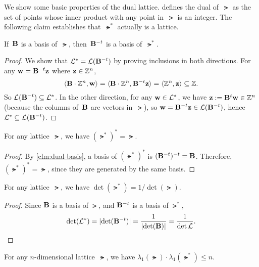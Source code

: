 \documentclass[11pt]{article}
\begin{document}
We show some basic properties of the dual lattice.
 defines the dual of~$\lat$ as the set of
points whose inner product with any point in~$\lat$ is an integer. The
following claim establishes that~$\lat^*$ actually is a lattice.

\begin{claim}
  \label{clm:dual-basis}
  If~$\mathbf{B}$ is a basis of~$\lat$, then~$\mathbf{B}^{-t}$ is a basis
  of~$\lat^*$.
\end{claim}

\begin{proof}
  We show that $\mathcal{L}^{*} = \mathcal{L}(\mathbf{B}^{-t})$ by proving inclusions in
  both directions. For any $\mathbf{w} = \mathbf{B}^{-t} \mathbf{z}$ where
  $\mathbf{z} \in \mathbb{Z}^n$,
  \[ \langle\mathbf{B} \cdot \mathbb{Z}^n, \mathbf{w}\rangle = \langle\mathbf{B} \cdot
      \mathbb{Z}^n,\mathbf{B}^{-t} \mathbf{z}\rangle = \langle\mathbb{Z}^n,\mathbf{z}\rangle \subseteq \mathbb{Z}. \] So
  $\mathcal{L}(\mathbf{B}^{-t}) \subseteq \mathcal{L}^*$. In the other direction, for any
  $\mathbf{w} \in \mathcal{L}^*$, we have $\mathbf{z} := \mathbf{B}^{t}\mathbf{w} \in \mathbb{Z}^{n}$
  (because the columns of~$\mathbf{B}$ are vectors in~$\lat$), so
  $\mathbf{w} = \mathbf{B}^{-t} \mathbf{z} \in \mathcal{L}(\mathbf{B}^{-t})$, hence
  $\mathcal{L}^* \subseteq \mathcal{L}(\mathbf{B}^{-t})$.
\end{proof}

\begin{claim}
  For any lattice~$\lat$, we have $(\lat^*)^* = \lat$.
\end{claim}

\begin{proof}
  By \cref{clm:dual-basis}, a basis of $(\lat^*)^*$ is
  $(\mathbf{B}^{-t})^{-t} = \mathbf{B}$. Therefore, $(\lat^*)^{*} = \lat$, since
  they are generated by the same basis.
\end{proof}

\begin{claim}
  \label{clm:dual-determinant}
  For any lattice~$\lat$, we have $\det(\lat^*) = 1/\det(\lat)$.
\end{claim}

\begin{proof}
  Since $\mathbf{B}$ is a basis of $\lat$, and $\mathbf{B}^{-t}$ is a basis of
  $\lat^*$,
  \[ \det(\mathcal{L}^*) = \lvert\det(\mathbf{B}^{-t})\rvert = \frac{1}{\lvert\det(\mathbf{B})\rvert} =
    \frac{1}{\det{\mathcal{L}}}.\]
\end{proof}

\begin{claim}
  For any $n$-dimensional lattice~$\lat$, we have
  $\lambda_1(\lat) \cdot \lambda_1(\lat^*) \leq n$.
\end{claim}
\end{document}
